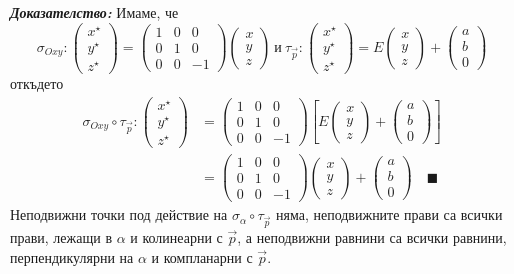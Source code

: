 \documentclass[12pt]{article}
\begin{document}
\begin{tcolorbox}
\end{tcolorbox}\textbf{\textit{Доказателство:}} Имаме, че $$\sigma_{Oxy}:\begin{pmatrix} x^\star \\ y^\star\\ z^\star\end{pmatrix}=\begin{pmatrix} 1 & 0 & 0 \\ 0 & 1 & 0 \\ 0 & 0 & -1\end{pmatrix}\begin{pmatrix} x\\ y\\ z\end{pmatrix}\ \text{и}\ \tau_{\vec{p}}:\begin{pmatrix} x^\star \\ y^\star\\ z^\star\end{pmatrix}=E\begin{pmatrix} x\\ y\\ z\end{pmatrix}+\begin{pmatrix} a \\ b\\ 0\end{pmatrix}$$ откъдето \begin{align*}\sigma_{Oxy}\circ\tau_{\vec{p}}:\begin{pmatrix} x^\star \\ y^\star\\ z^\star\end{pmatrix}&=\begin{pmatrix} 1 & 0 & 0 \\ 0 & 1 & 0 \\ 0 & 0 & -1\end{pmatrix}\left[E\begin{pmatrix} x\\ y\\ z\end{pmatrix}+\begin{pmatrix} a \\ b\\ 0\end{pmatrix}\right] \\ &=\begin{pmatrix} 1 & 0 & 0 \\ 0 & 1 & 0 \\ 0 & 0 & -1\end{pmatrix}\begin{pmatrix} x\\ y\\ z\end{pmatrix}+\begin{pmatrix} a \\ b \\ 0 \end{pmatrix}\quad \blacksquare\end{align*} Неподвижни точки под действие на $\sigma_{\alpha}\circ\tau_{\vec{p}}$ няма, неподвижните прави са всички прави, лежащи в $\alpha$ и колинеарни с $\vec{p}$, а неподвижни равнини са всички равнини, перпендикулярни на $\alpha$ и компланарни с $\vec{p}$.
\end{document}
